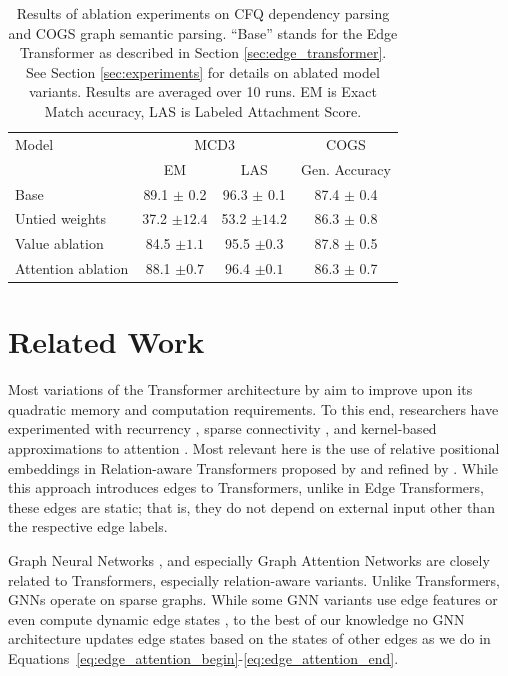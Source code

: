 \documentclass{article}
\begin{document}
\begin{table}
\small
\caption{Results of ablation experiments on CFQ dependency parsing and COGS graph semantic parsing. ``Base'' stands for the Edge Transformer as described in
  Section \ref{sec:edge_transformer}. See Section
  \ref{sec:experiments} for details on ablated model variants.
  Results are averaged over 10 runs. EM is Exact Match accuracy, LAS
  is Labeled Attachment Score. }
    \label{tbl:lesion_cfq}
    \centering
    \begin{tabular}{lccc}
    \toprule
    Model                    & \multicolumn{2}{c}{MCD3} & COGS\\
    
                             & EM      & LAS & Gen. Accuracy        \\
    \midrule
    Base         & 89.1 $\pm$ 0.2      & 96.3  $\pm$ 0.1 & 87.4 $\pm$ 0.4 \\
    Untied weights           & 37.2 $\pm 12.4$ & 53.2 $\pm 14.2$ & 86.3 $\pm$ 0.8     \\
    Value ablation & 84.5 $\pm 1.1 $      & 95.5 $\pm 0.3$ & 87.8 $\pm$ 0.5 \\
    Attention ablation & 88.1 $\pm 0.7$ & 96.4 $\pm 0.1$ & 86.3 $\pm$ 0.7 \\
    \bottomrule
    \end{tabular}
\end{table}

\section{Related Work}
Most variations of the Transformer architecture by
\citet{vaswani_attention_2017} aim to improve upon its quadratic
memory and computation requirements. To this end, researchers have
experimented with recurrency \citep{dai_transformer-xl_2019}, sparse
connectivity \citep{ainslie_etc_2020}, and kernel-based approximations
to attention \citep{choromanski_rethinking_2021}. Most relevant here
is the use of relative positional embeddings in Relation-aware
Transformers proposed by \citep{shaw_self-attention_2018} and refined
by \citep{dai_transformer-xl_2019}. While this approach introduces
edges to Transformers, unlike in Edge Transformers, these edges are
static; that is, they do not depend on external input other than the
respective edge labels.

Graph Neural Networks
\citep[GNNs;][]{gori_new_2005,scarselli_graph_2009,
  kipf_semi-supervised_2017}, and especially Graph Attention Networks
\citep{velickovic_graph_2018} are closely related to Transformers,
especially relation-aware variants. Unlike Transformers, GNNs operate
on sparse graphs. While some GNN variants use edge features
\citep{gilmer_neural_2017,chen_utilizing_2019} or even compute dynamic
edge states \citep{gong_exploiting_2019}, to the best of our knowledge
no GNN architecture updates edge states based on the states of other
edges as we do in
Equations~\ref{eq:edge_attention_begin}-\ref{eq:edge_attention_end}.
\end{document}
